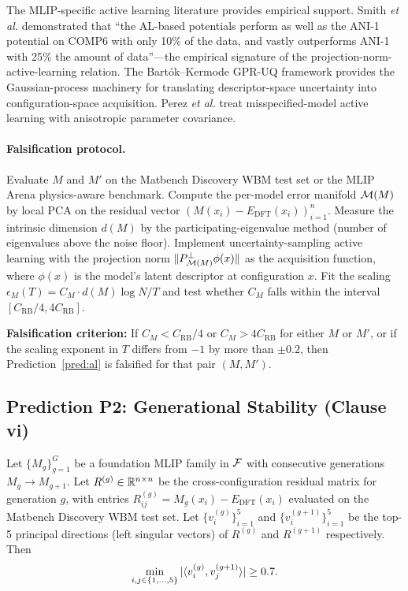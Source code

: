 The MLIP-specific active learning literature provides empirical support. Smith \emph{et al.}\cite{smith2018less} demonstrated that ``the AL-based potentials perform as well as the ANI-1 potential on COMP6 with only 10\% of the data, and vastly outperforms ANI-1 with 25\% the amount of data''---the empirical signature of the projection-norm-active-learning relation. The Bartók--Kermode GPR-UQ framework\cite{bartok2022gap} provides the Gaussian-process machinery for translating descriptor-space uncertainty into configuration-space acquisition. Perez \emph{et al.}\cite{perez2025misspecified} treat misspecified-model active learning with anisotropic parameter covariance.

\paragraph{Falsification protocol.} Evaluate $M$ and $M'$ on the Matbench Discovery WBM test set\cite{riebesell2025matbench} or the MLIP Arena physics-aware benchmark\cite{chiang2025mliparena}. Compute the per-model error manifold $\mathcal{M}(M)$ by local PCA on the residual vector $(M(x_i) - E_{\text{DFT}}(x_i))_{i=1}^n$. Measure the intrinsic dimension $d(M)$ by the participating-eigenvalue method (number of eigenvalues above the noise floor). Implement uncertainty-sampling active learning with the projection norm $\|P_{\mathcal{M}(M)}^\perp \phi(x)\|$ as the acquisition function, where $\phi(x)$ is the model's latent descriptor at configuration $x$. Fit the scaling $\epsilon_M(T) = C_M \cdot d(M) \log N / T$ and test whether $C_M$ falls within the interval $[C_{\text{RB}}/4, 4 C_{\text{RB}}]$.

\textbf{Falsification criterion:} If $C_M < C_{\text{RB}}/4$ or $C_M > 4 C_{\text{RB}}$ for either $M$ or $M'$, or if the scaling exponent in $T$ differs from $-1$ by more than $\pm 0.2$, then Prediction~\ref{pred:al} is falsified for that pair $(M, M')$.

\subsection{Prediction P2: Generational Stability (Clause vi)}\label{sec:prediction-p2}

\begin{prediction}\label{pred:gen}
Let $\{M_g\}_{g=1}^G$ be a foundation MLIP family in $\mathcal{F}$ with consecutive generations $M_g \to M_{g+1}$. Let $R^{(g)} \in \mathbb{R}^{n \times n}$ be the cross-configuration residual matrix for generation $g$, with entries $R^{(g)}_{ij} = M_g(x_i) - E_{\text{DFT}}(x_i)$ evaluated on the Matbench Discovery WBM test set. Let $\{v_i^{(g)}\}_{i=1}^5$ and $\{v_i^{(g+1)}\}_{i=1}^5$ be the top-5 principal directions (left singular vectors) of $R^{(g)}$ and $R^{(g+1)}$ respectively. Then
\begin{equation}\label{eq:gen-prediction}
    \min_{i,j \in \{1,\dots,5\}} |\langle v_i^{(g)}, v_j^{(g+1)} \rangle| \geq 0.7.
\end{equation}
\end{prediction}

